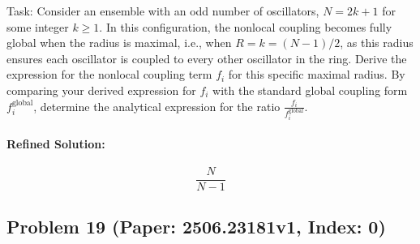 \documentclass[10pt]{article}
\begin{document}
Task:
Consider an ensemble with an odd number of oscillators, $N=2k+1$ for some integer $k \ge 1$. In this configuration, the nonlocal coupling becomes fully global when the radius is maximal, i.e., when $R=k=(N-1)/2$, as this radius ensures each oscillator is coupled to every other oscillator in the ring. Derive the expression for the nonlocal coupling term $f_i$ for this specific maximal radius. By comparing your derived expression for $f_i$ with the standard global coupling form $f_i^{\text{global}}$, determine the analytical expression for the ratio $\frac{f_i}{f_i^{\text{global}}}$.

\paragraph*{Refined Solution:}
\[ \dfrac{N}{N-1} \]

\newpage
\subsection*{Problem 19 (Paper: 2506.23181v1, Index: 0)}
\end{document}
